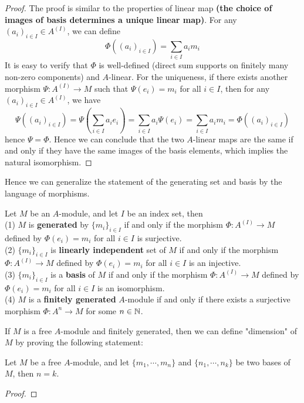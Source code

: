 \begin{proof}
    The proof is similar to the properties of linear map \textbf{(the choice of images of basis determines a unique linear map)}. For any \((a_i)_{i \in I} \in A^{(I)}\), we can define \[\Phi((a_i)_{i \in I}) = \sum_{i \in I} a_i m_i\]
    It is easy to verify that \(\Phi\) is well-defined (direct sum supports on finitely many non-zero components) and \(A\)-linear. For the uniqueness, if there exists another morphism \(\Psi: A^{(I)} \to M\) such that \(\Psi(e_i) = m_i\) for all \(i \in I\), then for any \((a_i)_{i \in I} \in A^{(I)}\), we have
    \[\Psi((a_i)_{i \in I}) = \Psi(\sum_{i \in I} a_i e_i) = \sum_{i \in I} a_i \Psi(e_i) = \sum_{i \in I} a_i m_i = \Phi((a_i)_{i \in I})\]
    hence \(\Psi = \Phi\). Hence we can conclude that the two \(A\)-linear maps are the same if and only if they have the same images of the basis elements, which implies the natural isomorphism.
\end{proof}

Hence we can generalize the statement of the generating set and basis by the language of morphisms.
\begin{corollary}
    Let \(M\) be an \(A\)-module, and let \(I\) be an index set, then\\
    (1) \(M\) is \textbf{generated} by \(\{m_i\}_{i \in I}\) if and only if the morphism \(\Phi: A^{(I)} \to M\) defined by \(\Phi(e_i) = m_i\) for all \(i \in I\) is surjective.\\
    (2) \(\{m_i\}_{i \in I}\) is \textbf{linearly independent} set of \(M\) if and only if the morphism \(\Phi: A^{(I)} \to M\) defined by \(\Phi(e_i) = m_i\) for all \(i \in I\) is an injective.\\
    (3) \(\{m_i\}_{i \in I}\) is a \textbf{basis} of \(M\) if and only if the morphism \(\Phi: A^{(I)} \to M\) defined by \(\Phi(e_i) = m_i\) for all \(i \in I\) is an isomorphism.\\
    (4) \(M\) is a \textbf{finitely generated} \(A\)-module if and only if there exists a surjective morphism \(\Phi: A^n \to M\) for some \(n \in \mathbb{N}\).
\end{corollary}


    If \(M\) is a free \(A\)-module and finitely generated, then we can define "dimension" of \(M\)  by proving the following statement:


    \begin{lemma}
        Let \(M\) be a free \(A\)-module, and let \(\{m_1,\cdots,m_n\}\) and \(\{n_1,\cdots,n_k\}\) be two bases of \(M\), then \(n=k\).
    \end{lemma}
    \begin{proof}
    \end{proof}

